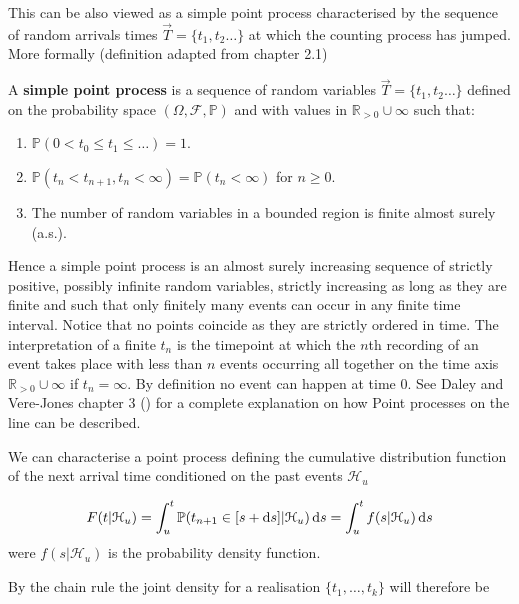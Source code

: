 This can be also viewed as a simple point process characterised by the sequence of random arrivals times $\vec{T} = \{ t_1, t_2 \dots \}$ at which the counting process has jumped. More formally (definition adapted from \cite{Jacobsen} chapter 2.1)

\begin{definition}
    A \textbf{simple point process} is a sequence of random variables $\vec{T} = \{ t_1, t_2 \dots \}$ defined on the probability space $(\Omega, \mathcal{F}, \mathbb{P})$ and with values in $\mathbb{R}_{>0} \cup \infty$ such that:
    \begin{enumerate}[label=(\roman*)]
        \item $\mathbb{P}(0 < t_0 \leq t_1 \leq \dots) = 1$.
        \item $\mathbb{P}(t_n < t_{n+1}, t_n < \infty) = \mathbb{P}(t_n < \infty)$ for $n \geq 0$.
        \item The number of random variables in a bounded region is finite almost surely (a.s.).
    \end{enumerate}
\end{definition}

Hence a simple point process is an almost surely increasing sequence of strictly positive, possibly infinite random variables, strictly increasing as long as they are finite and such that only finitely many events can occur in any finite time interval. Notice that no points coincide as they are strictly ordered in time.
The interpretation of a finite $t_n$ is the timepoint at which the $n$th recording of an event takes place with less than $n$ events occurring all together on the time axis $\mathbb{R}_{>0} \cup \infty$ if $t_n = \infty$. By definition no event can happen at time $0$. See Daley and Vere-Jones chapter 3 (\cite{Daley}) for a complete explanation on how Point processes on the line can be described.

We can characterise a point process defining the cumulative distribution function of the next arrival time conditioned on the past events $\mathcal{H}_u$

\begin{equation} \label{eq:CumDistPointProc}
    F(t|\mathcal{H}_u) = \int_u^t \mathbb{P}(t_{n+1} \in [s+\operatorname{d}\!{s}] | \mathcal{H}_u) \operatorname{d}\!{s} = \int_u^t f(s | \mathcal{H}_u) \operatorname{d}\!{s}
\end{equation}
were $f(s | \mathcal{H}_u)$ is the probability density function.

By the chain rule the joint density for a realisation $\{ t_1, \dots, t_k\}$ will therefore be

